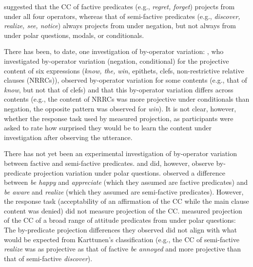 \documentclass[12pt, a4paper]{scrartcl}
\begin{document}
	\vspace{-.4\baselineskip}
	\citealt{karttunen_observations_1971} suggested that the CC of factive predicates (e.g., \emph{regret, forget}) projects from under all four operators, whereas that of semi-factive predicates (e.g., \emph{discover, realize, see, notice}) always projects from under negation, but not always from under polar questions, modals, or conditionals. 
	
There has been, to date, one investigation of by-operator variation: \citealt{smith_relationship_2014}, who investigated by-operator variation (negation, conditional) for the projective content of six expressions (\emph{know, the, win}, epithets, clefs, non-restrictive relative clauses (NRRCs)), observed by-operator variation for some contents (e.g., that of \emph{know}, but not that of clefs) and that this by-operator variation differs across contents (e.g., the content of NRRCs was more projective under conditionals than negation, the opposite pattern was observed for \emph{win}). It is not clear, however, whether the response task used by \citealt{smith_relationship_2014} measured projection, as participants were asked to rate how surprised they would be to learn the content under investigation after observing the utterance.

There has not yet been an experimental investigation of by-operator variation between factive and semi-factive predicates. \citealt{djarv_cognitive_2018} and \citealt{tonhauser_how_2018} did, however, observe by-predicate projection variation under polar questions. \citealt{djarv_cognitive_2018} observed a difference between \emph{be happy} and \emph{appreciate} (which they assumed are factive predicates) and \emph{be aware} and \emph{realize} (which they assumed are semi-factive predicates). However, the response task (acceptability of an affirmation of the CC while the main clause content was denied) did not measure projection of the CC. \citealt{tonhauser_how_2018} measured projection of the CC of a broad range of attitude predicates from under polar questions: The by-predicate projection differences they observed did not align with what would be expected from Karttunen's classification (e.g., the CC of semi-factive \emph{realize} was as projective as that of factive \emph{be annoyed} and more projective than that of semi-factive \emph{discover}).
\end{document}
